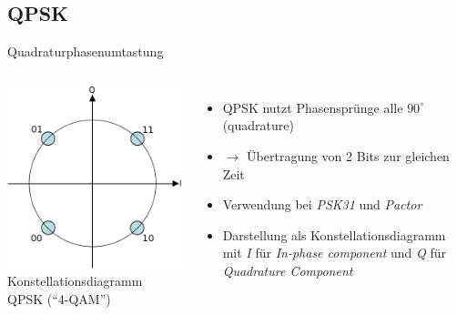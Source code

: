 \subsection{QPSK}
\begin{frame}{Quadraturphasenumtastung}
  \begin{columns}
    \includegraphics[width=\textwidth,height=.8\textheight,keepaspectratio]{a15/QPSK_Gray_Coded.png}\\
    {\tiny Konstellationsdiagramm QPSK (``4-QAM'')}
    \begin{itemize}
      \item QPSK nutzt Phasensprünge alle $90^\circ$ (quadrature)
      \item $\rightarrow$ Übertragung von 2 Bits zur gleichen Zeit
      \item Verwendung bei \emph{PSK31} und \emph{Pactor}
      \item Darstellung als Konstellationsdiagramm mit \emph{I} für \emph{In-phase component} und \emph{Q} für \emph{Quadrature Component}
    \end{itemize}
  \end{columns}
\end{frame}

